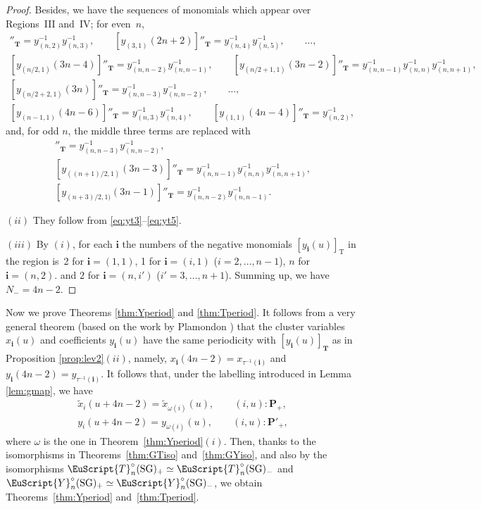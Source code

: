 \documentclass[pdftex]{sigma}
\numberwithin{equation}{section}
\theoremstyle{definition}
\begin{document}
\begin{proof}
Besides, we have the sequences of  monomials
which appear over Regions~III and~IV;
for even~$n$,
\begin{gather}
 [y_{(2,1)}(2n)]''_{\mathbf{T}}=y_{(n,2)}^{-1}y_{(n,3)}^{-1},
\qquad [y_{(3,1)}(2n+2)]''_{\mathbf{T}}=y_{(n,4)}^{-1}y_{(n,5)}^{-1},
\qquad \dots,\nonumber\\
 [y_{(n/2,1)}(3n-4)]''_{\mathbf{T}}=y_{(n,n-2)}^{-1}y_{(n,n-1)}^{-1},\qquad
 [y_{(n/2+1,1)}(3n-2)]''_{\mathbf{T}}=y_{(n,n-1)}^{-1}y_{(n,n)}^{-1}y_{(n,n+1)}^{-1},\nonumber\\
 [y_{(n/2+2,1)}(3n)]''_{\mathbf{T}}=y_{(n,n-3)}^{-1}y_{(n,n-2)}^{-1},\qquad
\dots,\nonumber\\
  [y_{(n-1,1)}(4n-6)]''_{\mathbf{T}}=y_{(n,3)}^{-1}y_{(n,4)}^{-1},
\qquad [y_{(1,1)}(4n-4)]''_{\mathbf{T}}=y_{(n,2)}^{-1},\label{eq:yt2}
\end{gather}
and, for odd $n$, the middle three terms are replaced with
\begin{gather}
 [y_{((n-1)/2,1)}(3n-5)]''_{\mathbf{T}}=y_{(n,n-3)}^{-1}y_{(n,n-2)}^{-1},\nonumber\\
 [y_{((n+1)/2,1)}(3n-3)]''_{\mathbf{T}}=
y_{(n,n-1)}^{-1}y_{(n,n)}^{-1}y_{(n,n+1)}^{-1},\nonumber\\
 [y_{(n+3)/2,1)}(3n-1)]''_{\mathbf{T}}=y_{(n,n-2)}^{-1}y_{(n,n-1)}^{-1}.\label{eq:yt5}
\end{gather}

$(ii)$ They  follow from
\eqref{eq:yt3}--\eqref{eq:yt5}.


$(iii)$ By $(i)$, for each  $\mathbf{i}$
the numbers of the negative monomials
$[y_{\mathbf{i}}(u)]_{\mathrm{T}}$
in the region is~2 for $\mathbf{i}= (1,1)$,
 1 for $\mathbf{i}= (i,1)$ ($i=2,\dots,n-1$),
$n$ for $\mathbf{i}= (n,2)$.
and $2$ for $\mathbf{i}=(n,i')$ ($i'=3,\dots,n+1$).
Summing up, we have $N_-=4n-2$.
\end{proof}

Now we prove
Theorems \ref{thm:Yperiod} and \ref{thm:Tperiod}.
It follows from  a very general theorem
\cite[Theorem 5.1]{Inoue10a}
(based on the work by Plamondon \cite{Plamondon10a,Plamondon10b})
that the cluster variables
$x_{\mathbf{i}}(u)$ and coef\/f\/icients $y_{\mathbf{i}}(u)$
have the same periodicity with
$[y_{\mathbf{i}}(u)]_{\mathbf{T}}$ as in Proposition \ref{prop:lev2}$(ii)$,
namely,
$x_{\mathbf{i}}(4n-2)=x_{\tau^{-1}(\mathbf{i})}$
and
$y_{\mathbf{i}}(4n-2)=y_{\tau^{-1}(\mathbf{i})}$.
It follows that, under the labelling introduced in Lemma
\ref{lem:gmap}, we have
\begin{gather}
\tilde{x}_i(u+4n-2) =\tilde{x}_{\omega(i)}(u),
\qquad (i,u):\mathbf{P}_+,\nonumber\\
y_i(u+4n-2) =y_{\omega(i)}(u),
\qquad (i,u):\mathbf{P}'_+,\label{eq:xperiod}
\end{gather}
where $\omega$ is the one in Theorem~\ref{thm:Yperiod}$(i)$.
Then, thanks to the isomorphisms
in Theorems~\ref{thm:GTiso} and~\ref{thm:GYiso},
and also by the isomorphisms
$\EuScript{T}^{\circ}_{n}(\mathrm{SG})_+
\simeq
\EuScript{T}^{\circ}_{n}(\mathrm{SG})_-
$
and
$\EuScript{Y}^{\circ}_{n}(\mathrm{SG})_+
\simeq
\EuScript{Y}^{\circ}_{n}(\mathrm{SG})_-
$,
we obtain
Theorems~\ref{thm:Yperiod} and~\ref{thm:Tperiod}.
\end{document}
